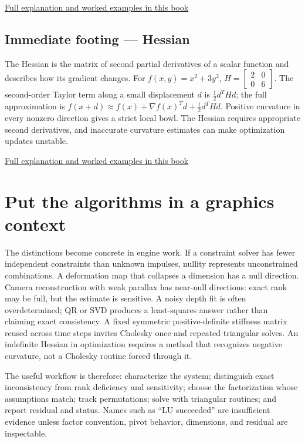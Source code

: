 \hyperref[02-foundations-ii-ch021-jacobians-curvature-and-local-approximation]{Full explanation and worked examples in this book}

\subsection{Immediate footing --- Hessian}\label{01-foundations-i-ch020-immediate-footing-hessian}

The Hessian is the matrix of second partial derivatives of a scalar function and describes how its gradient changes. For \(f(x,y)=x^2+3y^2\), \(H=\begin{bmatrix}2&0\\0&6\end{bmatrix}\). The second-order Taylor term along a small displacement \(d\) is \(\tfrac12d^THd\); the full approximation is \(f(x+d)\approx f(x)+\nabla f(x)^Td+\tfrac12d^THd\). Positive curvature in every nonzero direction gives a strict local bowl. The Hessian requires appropriate second derivatives, and inaccurate curvature estimates can make optimization updates unstable.

\hyperref[02-foundations-ii-ch021-jacobians-curvature-and-local-approximation]{Full explanation and worked examples in this book}

\section{Put the algorithms in a graphics context}\label{01-foundations-i-ch020-put-the-algorithms-in-a-graphics-context}

The distinctions become concrete in engine work. If a constraint solver has fewer independent constraints than unknown impulses, nullity represents unconstrained combinations. A deformation map that collapses a dimension has a null direction. Camera reconstruction with weak parallax has near-null directions: exact rank may be full, but the estimate is sensitive. A noisy depth fit is often overdetermined; QR or SVD produces a least-squares answer rather than claiming exact consistency. A fixed symmetric positive-definite stiffness matrix reused across time steps invites Cholesky once and repeated triangular solves. An indefinite Hessian in optimization requires a method that recognizes negative curvature, not a Cholesky routine forced through it.

The useful workflow is therefore: characterize the system; distinguish exact inconsistency from rank deficiency and sensitivity; choose the factorization whose assumptions match; track permutations; solve with triangular routines; and report residual and status. Names such as ``LU succeeded'' are insufficient evidence unless factor convention, pivot behavior, dimensions, and residual are inspectable.


